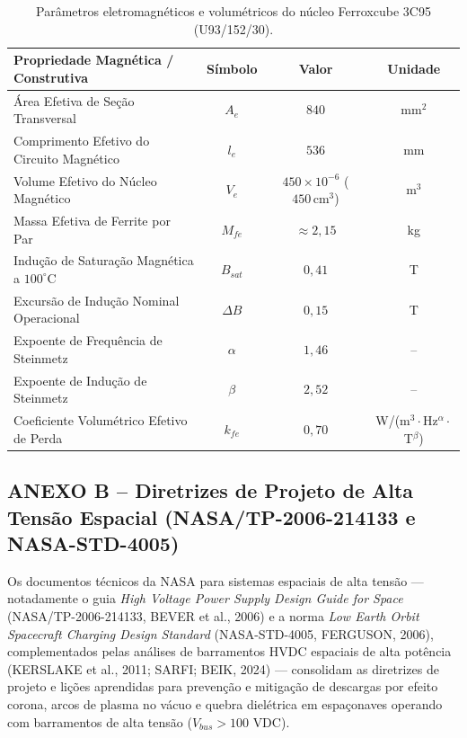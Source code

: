 \begin{table}[!ht]
\centering
\small
\renewcommand{\arraystretch}{0.85}
\caption{Parâmetros eletromagnéticos e volumétricos do núcleo Ferroxcube 3C95 (U93/152/30).}
\label{tab:anexo_ferroxcube_3c95}
\begin{tabular}{lccc}
\hline
\textbf{Propriedade Magnética / Construtiva} & \textbf{Símbolo} & \textbf{Valor} & \textbf{Unidade} \\ \hline
Área Efetiva de Seção Transversal & $A_e$ & $840$ & mm$^2$ \\
Comprimento Efetivo do Circuito Magnético & $l_e$ & $536$ & mm \\
Volume Efetivo do Núcleo Magnético & $V_e$ & $450\times 10^{-6}$ ($450\,\mathrm{cm^3}$) & m$^3$ \\
Massa Efetiva de Ferrite por Par & $M_{fe}$ & $\approx 2{,}15$ & kg \\
Indução de Saturação Magnética a $100^\circ\text{C}$ & $B_{sat}$ & $0{,}41$ & T \\
Excursão de Indução Nominal Operacional & $\Delta B$ & $0{,}15$ & T \\
Expoente de Frequência de Steinmetz & $\alpha$ & $1{,}46$ & -- \\
Expoente de Indução de Steinmetz & $\beta$ & $2{,}52$ & -- \\
Coeficiente Volumétrico Efetivo de Perda & $k_{fe}$ & $0{,}70$ & W/(m$^3\cdot$Hz$^\alpha\cdot$T$^\beta$) \\ \hline
\end{tabular}
\end{table}

\vspace{0.8cm}
\subsection*{ANEXO B -- Diretrizes de Projeto de Alta Tensão Espacial (NASA/TP-2006-214133 e NASA-STD-4005)}

Os documentos técnicos da NASA para sistemas espaciais de alta tensão --- notadamente o guia \textit{High Voltage Power Supply Design Guide for Space} (NASA/TP-2006-214133, BEVER et al., 2006) e a norma \textit{Low Earth Orbit Spacecraft Charging Design Standard} (NASA-STD-4005, FERGUSON, 2006), complementados pelas análises de barramentos HVDC espaciais de alta potência (KERSLAKE et al., 2011; SARFI; BEIK, 2024) --- consolidam as diretrizes de projeto e lições aprendidas para prevenção e mitigação de descargas por efeito corona, arcos de plasma no vácuo e quebra dielétrica em espaçonaves operando com barramentos de alta tensão ($V_{bus} > 100\text{ VDC}$).

